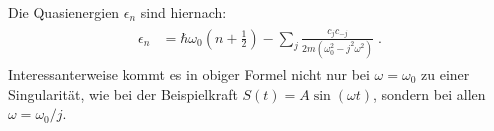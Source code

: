        Die Quasienergien $\epsilon_n$ sind hiernach:
       \begin{align}
         \begin{split}
           \epsilon_n &= \hbar \omega_0\left(n+\frac{1}{2}\right) - \sum_j \frac{c_jc_{-j}}{2m(\omega_0^2-j^2\omega^2)} \; .
         \end{split}
       \end{align}
       Interessanterweise kommt es in obiger Formel nicht nur bei $\omega = \omega_0$ zu einer Singularität, wie bei der Beispielkraft $S(t) = A\sin(\omega t)$, sondern bei allen $\omega = \omega_0 / j$.



